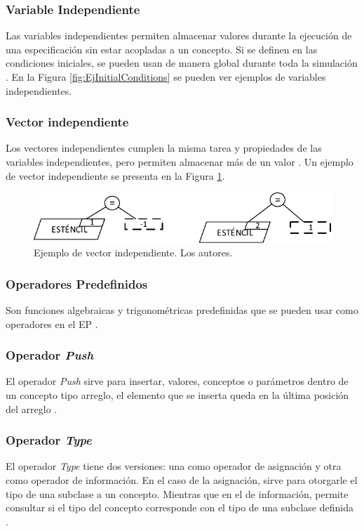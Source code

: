 \subsubsection{Variable Independiente}
Las variables independientes permiten almacenar valores durante la ejecución de una especificación sin estar acopladas a un concepto. Si se definen en las condiciones iniciales, se pueden usan de manera global durante toda la simulación \citep{norena2018det}. En la Figura \ref{fig:EjInitialConditions} se pueden ver ejemplos de variables independientes.\\

\subsubsection{Vector independiente}
Los vectores independientes cumplen la misma tarea y propiedades de las variables independientes, pero permiten almacenar más de un valor \citep{norena2018det}. Un ejemplo de vector independiente se presenta en la Figura \ref{fig:EjVector}.

\begin{figure}[h]
	\centering%
	\includegraphics[width=0.5\linewidth]{Fig/EjVectorIndependiente.pdf}%
	\caption[Ejemplo de vector independiente.]{Ejemplo de vector independiente. Los autores.} \label{fig:EjVector}
\end{figure}

\subsubsection{Operadores Predefinidos}
Son funciones algebraicas y trigonométricas predefinidas que se pueden usar como operadores en el EP \citep{JCalle}.

\subsubsection[Operador \emph{Push}]{Operador {\normalfont \bfseries \itshape Push}}
El operador \textit{Push} sirve para insertar, valores, conceptos o parámetros dentro de un concepto tipo arreglo, el elemento que se inserta queda en la última posición del arreglo  \citep{JCalle}.
\subsubsection[Operador \emph{Type}]{Operador {\normalfont \bfseries \itshape Type}}
El operador \textit{Type} tiene dos versiones: una como operador de asignación y otra como operador de información. En el caso de la asignación, sirve para otorgarle el tipo de una subclase a un concepto. Mientras que en el de información, permite consultar si el tipo del concepto corresponde con el tipo de una subclase definida \citep{JCalle}.
